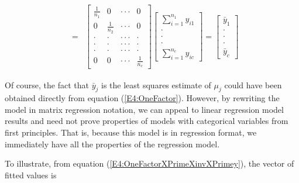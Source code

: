 \begin{center}
\begin{eqnarray}
\\
&=&%
\begin{bmatrix}
\frac{1}{n_1} & 0 & \cdot \cdot \cdot  & 0 \\
0 & \frac{1}{n_2} & \cdot \cdot \cdot  & 0 \\
\cdot  & \cdot  & \cdot \cdot \cdot  & \cdot  \\
\cdot  & \cdot  & \cdot \cdot \cdot  & \cdot  \\
\cdot  & \cdot  & \cdot \cdot \cdot  & \cdot  \\
0 & 0 & \cdot \cdot \cdot  & \frac{1}{n_c}
\end{bmatrix}
\begin{bmatrix}
\sum_{i=1}^{n_1}y_{i1} \\
\cdot  \\
\cdot  \\
\cdot  \\
\sum_{i=1}^{n_{c}}y_{ic}%
\end{bmatrix}%
=%
\begin{bmatrix}
\bar{y}_1 \\
\cdot  \\
\cdot  \\
\cdot  \\
\bar{y}_{c}%
\end{bmatrix}%
\end{eqnarray}
\end{center}

Of course, the fact that $\bar{y}_{j}$ is the least squares estimate
of $\mu_{j}$ could have been obtained directly from equation
(\ref{E4:OneFactor}). However, by rewriting the model in matrix
regression notation, we can appeal to linear regression model
results and need not prove properties of models with categorical
variables from first principles. That is, because this model is in
regression format, we immediately have all the properties of the
regression model.

To illustrate, from equation (\ref{E4:OneFactorXPrimeXinvXPrimey}),
the vector of fitted values is

